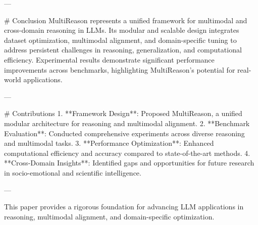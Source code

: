 ---

# Conclusion  
MultiReason represents a unified framework for multimodal and cross-domain reasoning in LLMs. Its modular and scalable design integrates dataset optimization, multimodal alignment, and domain-specific tuning to address persistent challenges in reasoning, generalization, and computational efficiency. Experimental results demonstrate significant performance improvements across benchmarks, highlighting MultiReason's potential for real-world applications.

---

# Contributions  
1. **Framework Design**: Proposed MultiReason, a unified modular architecture for reasoning and multimodal alignment.  
2. **Benchmark Evaluation**: Conducted comprehensive experiments across diverse reasoning and multimodal tasks.  
3. **Performance Optimization**: Enhanced computational efficiency and accuracy compared to state-of-the-art methods.  
4. **Cross-Domain Insights**: Identified gaps and opportunities for future research in socio-emotional and scientific intelligence.  

--- 

This paper provides a rigorous foundation for advancing LLM applications in reasoning, multimodal alignment, and domain-specific optimization.